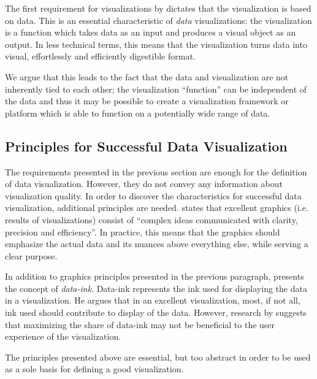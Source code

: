 The first requirement for visualizations by \citet{kosara_visualization_2007} dictates that the visualization is based on data. This is an essential characteristic of \emph{data} visualizations: the visualization is a function which takes data as an input and produces a visual object as an output. In less technical terms, this means that the visualization turns data into visual, effortlessly and efficiently digestible format.

We argue that this leads to the fact that the data and visualization are not inherently tied to each other; the visualization ``function'' can be independent of the data and thus it may be possible to create a visualization framework or platform which is able to function on a potentially wide range of data.


\subsection{Principles for Successful Data Visualization}

The requirements presented in the previous section are enough for the definition of data visualization. However, they do not convey any information about visualization quality. In order to discover the characteristics for successful data visualization, additional principles are needed. \citet[p. ~13]{tufte_visual_1986} states that excellent graphics (i.e. results of visualizations) consist of ``complex ideas communicated with clarity, precision and efficiency''. In practice, this means that the graphics should emphasize the actual data and its nuances above everything else, while serving a clear purpose.

In addition to graphics principles presented in the previous paragraph, \citet[p. ~93]{tufte_visual_1986} presents the concept of \emph{data-ink}. Data-ink represents the ink used for displaying the data in a visualization. He argues that in an excellent visualization, most, if not all, ink used should contribute to display of the data. However, research by \citet{inbar_minimalism_2007} suggests that maximizing the share of data-ink may not be beneficial to the user experience of the visualization. 

The principles presented above are essential, but too abstract in order to be used as a sole basis for defining a good visualization. 

